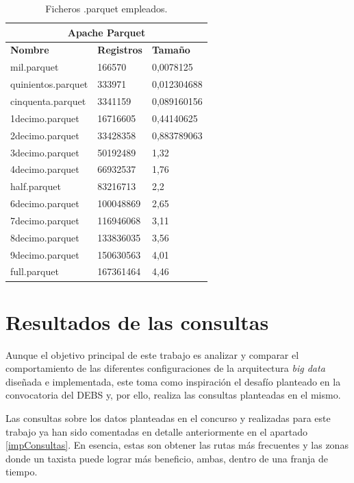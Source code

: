 \begin{table}[htp!]
	\centering
	\caption{Ficheros .parquet empleados.}
	\label{ficherosParquet}
	\begin{tabular}{|l|l|l|}
		\hline
		\multicolumn{3}{|c|}{\textbf{Apache Parquet}}             \\ \hline
		\textbf{Nombre}    & \textbf{Registros} & \textbf{Tamaño} \\ \hline
		mil.parquet        & 166570             & 0,0078125       \\ \hline
		quinientos.parquet & 333971             & 0,012304688     \\ \hline
		cinquenta.parquet  & 3341159            & 0,089160156     \\ \hline
		1decimo.parquet    & 16716605           & 0,44140625      \\ \hline
		2decimo.parquet    & 33428358           & 0,883789063     \\ \hline
		3decimo.parquet    & 50192489           & 1,32            \\ \hline
		4decimo.parquet    & 66932537           & 1,76            \\ \hline
		half.parquet       & 83216713           & 2,2             \\ \hline
		6decimo.parquet    & 100048869          & 2,65            \\ \hline
		7decimo.parquet    & 116946068          & 3,11            \\ \hline
		8decimo.parquet    & 133836035          & 3,56            \\ \hline
		9decimo.parquet    & 150630563          & 4,01            \\ \hline
		full.parquet       & 167361464          & 4,46            \\ \hline
	\end{tabular}
\end{table}

\section{Resultados de las consultas}
Aunque el objetivo principal de este trabajo es analizar y comparar el comportamiento de las diferentes configuraciones de la arquitectura \textit{big data} diseñada e implementada, este toma como inspiración el desafío planteado en la convocatoria del \gls{DEBS} \cite{grandChallenge} y, por ello, realiza las consultas planteadas en el mismo.

Las consultas sobre los datos planteadas en el concurso y realizadas para este trabajo ya han sido comentadas en detalle anteriormente en el apartado \ref{impConsultas}. En esencia, estas son obtener las rutas más frecuentes y las zonas donde un taxista puede lograr más beneficio, ambas, dentro de una franja de tiempo.

